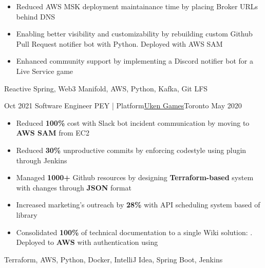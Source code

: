 \begin{experiences}
{\begin{itemize}
                        \item Reduced AWS MSK deployment maintainance time by placing Broker URLs behind DNS

                        \item Enabling better visibility and customizability by rebuilding custom Github Pull Request notifier bot with Python. Deployed with AWS SAM

                        \item Enhanced community support by implementing a Discord notifier bot for a Live Service game
                    \end{itemize}
                    }
                    {Reactive Spring, Web3 Manifold, AWS, Python, Kafka, Git LFS}
                    
  \experience
    {Oct 2021}   {Software Engineer PEY | Platform}{\href{https://uken.com}{Uken Games}}{Toronto}
    {May 2020} {
                    \begin{itemize}
                        \setlength\itemsep{0.2em}
                        \item Reduced \textbf{100\%} cost with Slack bot incident communication by moving to \textbf{AWS SAM} from EC2
                        
                        \item Reduced \textbf{30\%} unproductive commits by enforcing codestyle using  plugin through Jenkins
                        
                        \item Managed \textbf{1000+} Github resources by designing \textbf{Terraform-based} system with changes through \textbf{JSON} format

                        \item Increased marketing's outreach by \textbf{28\%} with API scheduling system based of  library
                        
                        \item Consolidated \textbf{100\%} of technical documentation to a single Wiki solution: . Deployed to \textbf{AWS} with authentication using 
                    \end{itemize}
                    }
                    {Terraform, AWS, Python, Docker, IntelliJ Idea, Spring Boot, Jenkins}
\end{experiences}
